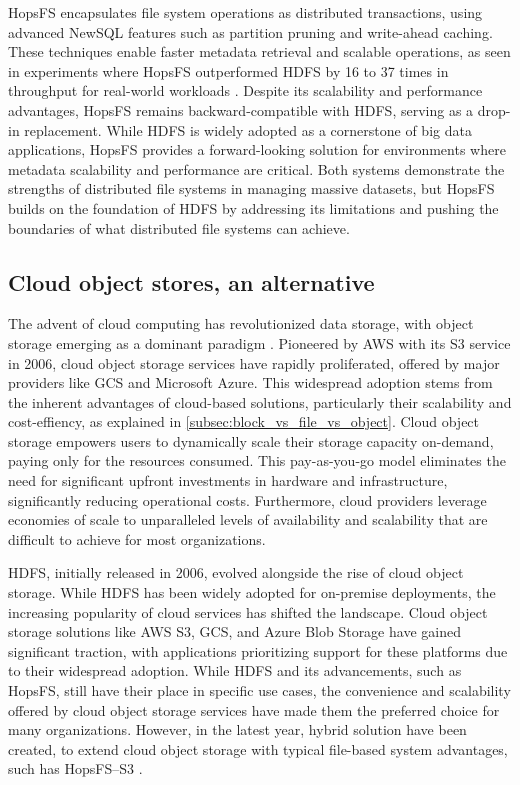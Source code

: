 \gls{HopsFS} encapsulates file system operations as distributed transactions, using advanced NewSQL features such as partition pruning and write-ahead caching. These techniques enable faster metadata retrieval and scalable operations, as seen in experiments where \gls{HopsFS} outperformed \gls{HDFS} by 16 to 37 times in throughput for real-world workloads \cite{10.1145/3626246.3653389}. Despite its scalability and performance advantages, \gls{HopsFS} remains backward-compatible with \gls{HDFS}, serving as a drop-in replacement. While \gls{HDFS} is widely adopted as a cornerstone of big data applications, \gls{HopsFS} provides a forward-looking solution for environments where metadata scalability and performance are critical. Both systems demonstrate the strengths of distributed file systems in managing massive datasets, but \gls{HopsFS} builds on the foundation of \gls{HDFS} by addressing its limitations and pushing the boundaries of what distributed file systems can achieve.

\subsection{Cloud object stores, an alternative}
The advent of cloud computing has revolutionized data storage, with object storage emerging as a dominant paradigm \cite{wuCloudStorageInfrastructure2010}. Pioneered by \gls{AWS} with its S3 service in 2006, cloud object storage services have rapidly proliferated, offered by major providers like \gls{GCS} and Microsoft Azure. This widespread adoption stems from the inherent advantages of cloud-based solutions, particularly their scalability and cost-effiency, as explained in \ref{subsec:block_vs_file_vs_object}. Cloud object storage empowers users to dynamically scale their storage capacity on-demand, paying only for the resources consumed. This pay-as-you-go model eliminates the need for significant upfront investments in hardware and infrastructure, significantly reducing operational costs. Furthermore, cloud providers leverage economies of scale to unparalleled levels of availability and scalability that are difficult to achieve for most organizations.

\gls{HDFS}, initially released in 2006, evolved alongside the rise of cloud object storage. While \gls{HDFS} has been widely adopted for on-premise deployments, the increasing popularity of cloud services has shifted the landscape. Cloud object storage solutions like \gls{AWS} S3, \gls{GCS}, and Azure Blob Storage have gained significant traction, with applications prioritizing support for these platforms due to their widespread adoption. While \gls{HDFS} and its advancements, such as \gls{HopsFS}, still have their place in specific use cases, the convenience and scalability offered by cloud object storage services have made them the preferred choice for many organizations. However, in the latest year, hybrid solution have been created, to extend cloud object storage with typical file-based system advantages, such has \gls{HopsFS}--S3 \cite{ismailHopsFSS3ExtendingObject2020}.